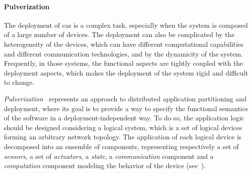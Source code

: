 \documentclass[12pt,a4paper]{article}
\begin{document}
\paragraph{Pulverization}
The deployment of \ac{cas} is a complex task,
especially when the system is composed of a large number of devices.
%
The deployment can also be complicated by the heterogeneity of the devices,
which can have different computational capabilities and different communication technologies, 
and by the dynamicity of the system.
%
Frequently,
in those systems,
the functional aspects are tightly coupled with the deployment aspects,
which makes the deployment of the system rigid and difficult to change.

\emph{Pulverization}~\cite{DBLP:journals/fi/CasadeiPPVW20} represents an approach to distributed application partitioning and deployment,
where its goal is to provide a way to specify the functional semantics of the software in a deployment-independent way.
%
To do so,
the application logic should be designed considering a logical system,
which is a set of logical devices forming an arbitrary network topology.
%
The application of each logical device is decomposed into an ensemble of components,
representing respectively a set of \emph{sensors},
a set of \emph{actuators},
a \emph{state},
a \emph{communication} component and a \emph{computation} component modeling the behavior of the device (see~).
%
\end{document}
